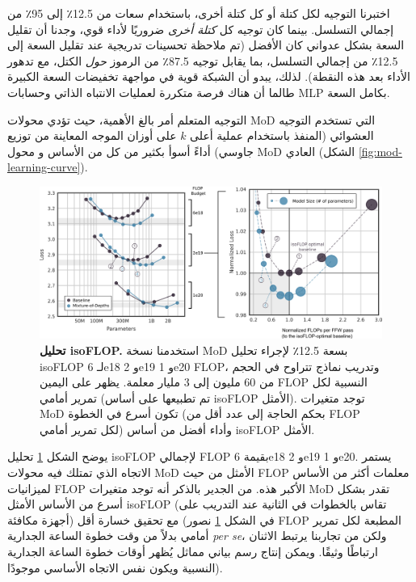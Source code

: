 \documentclass[11pt, a4paper, onecolumn, logo, copyright]{googledeepmind}
\begin{document}
اختبرنا التوجيه لكل كتلة أو كل كتلة أخرى، باستخدام سعات من 12.5٪ إلى 95٪ من إجمالي التسلسل. بينما كان توجيه كل \textit{كتلة أخرى} ضروريًا لأداء قوي، وجدنا أن تقليل السعة بشكل عدواني كان الأفضل (تم ملاحظة تحسينات تدريجية عند تقليل السعة إلى 12.5٪ من إجمالي التسلسل، بما يقابل توجيه 87.5٪ من الرموز \textit{حول} الكتل، مع تدهور الأداء بعد هذه النقطة). لذلك، يبدو أن الشبكة قوية في مواجهة تخفيضات السعة الكبيرة طالما أن هناك فرصة متكررة لعمليات الانتباه الذاتي وحسابات MLP بكامل السعة.

التوجيه المتعلم أمر بالغ الأهمية، حيث تؤدي محولات MoD التي تستخدم التوجيه العشوائي (المنفذ باستخدام عملية أعلى $k$ على أوزان الموجه المعاينة من توزيع جاوسي) أداءً أسوأ بكثير من كل من الأساس و محول MoD العادي (الشكل \ref{fig:mod-learning-curve}).

\begin{figure}[h]
\centering
\includegraphics[width=\textwidth]{mod-isoflop.png}
\caption{\textbf{تحليل isoFLOP.} استخدمنا نسخة MoD بسعة 12.5٪ لإجراء تحليل isoFLOP لـ 6e18 و 2e19 و 1e20 FLOP، وتدريب نماذج تتراوح في الحجم من 60 مليون إلى 3 مليار معلمة. يظهر على اليمين FLOP النسبية لكل تمرير أمامي (تم تطبيعها على أساس isoFLOP الأمثل). توجد متغيرات MoD تكون أسرع في الخطوة (بحكم الحاجة إلى عدد أقل من FLOP لكل تمرير أمامي) وأداء أفضل من أساس isoFLOP الأمثل.}
\label{fig:isoflop}
\end{figure}

يوضح الشكل \ref{fig:isoflop} تحليل isoFLOP لإجمالي FLOP بقيمة 6e18 و 2e19 و 1e20. يستمر الاتجاه الذي تمتلك فيه محولات MoD الأمثل من حيث FLOP معلمات أكثر من الأساس لميزانيات FLOP الأكبر هذه. من الجدير بالذكر أنه توجد متغيرات MoD تقدر بشكل أسرع من الأساس الأمثل isoFLOP (تقاس بالخطوات في الثانية عند التدريب على أجهزة مكافئة) مع تحقيق خسارة أقل (في الشكل \ref{fig:isoflop} نصور FLOP المطبعة لكل تمرير أمامي بدلاً من وقت خطوة الساعة الجدارية \textit{per se}، ولكن من تجاربنا يرتبط الاثنان ارتباطًا وثيقًا. ويمكن إنتاج رسم بياني مماثل يُظهر أوقات خطوة الساعة الجدارية النسبية ويكون نفس الاتجاه الأساسي موجودًا).
\end{document}
